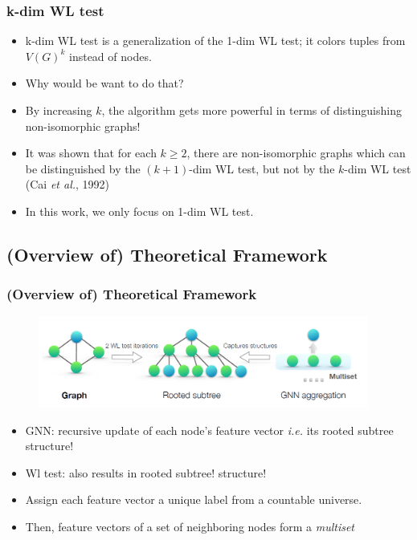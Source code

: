 \documentclass{beamer}
\begin{document}
\begin{frame}
\frametitle{k-dim WL test}

\begin{itemize}
	\item k-dim WL test is a generalization of the 1-dim WL test; it colors tuples from $V(G)^k$ instead of nodes. \pause
	
	\item Why would be want to do that? \pause
	
	\item  By increasing $k$, the algorithm gets more powerful in terms of distinguishing non-isomorphic graphs!   \pause

	\item It was shown that for each $k \geq 2$, there are non-isomorphic graphs which can be distinguished by the $(k + 1)$-dim WL test, but not by the $k$-dim WL test (Cai {\it et al.}, 1992) \pause
	
	\item In this work, we only focus on 1-dim WL test.
\end{itemize}

\end{frame}

\subsection{(Overview of) Theoretical Framework}

\begin{frame}
\frametitle{(Overview of) Theoretical Framework}

\begin{figure}[hbt]
	\includegraphics[height=3cm]{fig2.png}
\end{figure}

\begin{itemize}
    \item GNN: recursive update of each node's feature vector {\it i.e.} its rooted subtree structure! \pause
    
    \item Wl test: also results in rooted subtree! structure!
    
    \item Assign each feature vector a unique label from a countable universe.
    
    \item Then, feature vectors of a set of neighboring nodes form a {\it multiset}
\end{itemize}
\end{frame}
\end{document}
